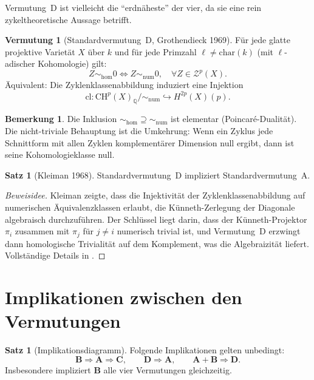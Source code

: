\documentclass[12pt,a4paper]{amsart}
\theoremstyle{definition}
\newtheorem{satz}[theorem]{Satz}
\newtheorem{vermutung}[theorem]{Vermutung}
\newtheorem{bemerkung}[theorem]{Bemerkung}
\newcommand{\Q}{\mathbb{Q}}
\newcommand{\CH}{\mathrm{CH}}
\newcommand{\cl}{\mathrm{cl}}
\newcommand{\ch}{\mathrm{char}}
\begin{document}
Vermutung~D ist vielleicht die ``erdnäheste'' der vier, da sie eine rein
zykeltheoretische Aussage betrifft.

\begin{vermutung}[Standardvermutung~D, Grothendieck 1969]\label{verm:D}
Für jede glatte projektive Varietät $X$ über $k$ und für jede Primzahl
$\ell \neq \ch(k)$ (mit $\ell$-adischer Kohomologie) gilt:
\[
  Z \sim_{\mathrm{hom}} 0 \iff Z \sim_{\mathrm{num}} 0,
  \quad \forall Z \in \mathcal{Z}^p(X).
\]
Äquivalent: Die Zyklenklassenabbildung induziert eine Injektion
\[
  \cl: \CH^p(X)_\Q / {\sim_{\mathrm{num}}} \hookrightarrow H^{2p}(X)(p).
\]
\end{vermutung}

\begin{bemerkung}
Die Inklusion ${\sim_{\mathrm{hom}}} \supseteq {\sim_{\mathrm{num}}}$
ist elementar (Poincaré-Dualität).  Die nicht-triviale Behauptung ist die
Umkehrung: Wenn ein Zyklus jede Schnittform mit allen Zyklen komplementärer
Dimension null ergibt, dann ist seine Kohomologieklasse null.
\end{bemerkung}

\begin{satz}[Kleiman 1968]\label{satz:D_impliziert_A}
Standardvermutung~D impliziert Standardvermutung~A.
\end{satz}

\begin{proof}[Beweisidee]
Kleiman zeigte, dass die Injektivität der Zyklenklassenabbildung auf
numerischen Äquivalenzklassen erlaubt, die Künneth-Zerlegung der Diagonale
algebraisch durchzuführen.  Der Schlüssel liegt darin, dass der Künneth-Projektor
$\pi_i$ zusammen mit $\pi_j$ für $j \neq i$ numerisch trivial ist, und
Vermutung~D erzwingt dann homologische Trivialität auf dem Komplement,
was die Algebraizität liefert.  Vollständige Details in \cite{kleiman1968}.
\end{proof}

\section{Implikationen zwischen den Vermutungen}\label{sec:implikationen}

\begin{satz}[Implikationsdiagramm]\label{satz:implikationen}
Folgende Implikationen gelten unbedingt:
\[
  \mathbf{B} \Rightarrow \mathbf{A} \Rightarrow \mathbf{C},
  \qquad
  \mathbf{D} \Rightarrow \mathbf{A},
  \qquad
  \mathbf{A} + \mathbf{B} \Rightarrow \mathbf{D}.
\]
Insbesondere impliziert $\mathbf{B}$ alle vier Vermutungen gleichzeitig.
\end{satz}
\end{document}
